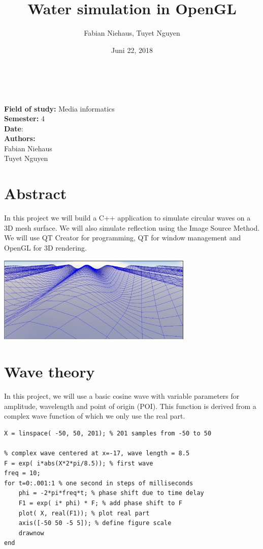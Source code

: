 \documentclass[12pt,a4paper]{scrartcl}
\title{Water simulation in OpenGL}
\author{Fabian Niehaus, Tuyet Nguyen}
\date{Juni 22, 2018}
\begin{document}
\begin{titlepage}
	\centering
	\ \\[2cm]
	{\huge\textbf{\@title}} 
	\\[3cm]
	\large
	\textbf{Field of study:} Media informatics \\
	\textbf{Semester:} 4
	\\[2cm]
	\textbf{Date}: \@date
	\\[2cm]
	\textbf {Authors:}
	\\Fabian Niehaus
	\\Tuyet Nguyen
\end{titlepage}

\newpage
\setcounter{page}{0}
\tableofcontents
\newpage
\listoffigures

\newpage
\ofoot[]{\pagemark}
\normalsize

\section{Abstract}
In this project we will build a C++ application to simulate circular waves on a 3D mesh surface. We will also simulate reflection using the Image Source Method. We will use QT Creator for programming, QT for window management and OpenGL for 3D rendering.

\includegraphics[width=0.7\textwidth]{Images/SinWaves.jpg}

\section{Wave theory}\label{wave-theory}
In this project, we will use a basic cosine wave with variable parameters for amplitude, wavelength and point of origin (POI). This function is derived from a complex wave function of which we only use the real part.
\begin{lstlisting}[language=PSEUDO]
X = linspace( -50, 50, 201); % 201 samples from -50 to 50

% complex wave centered at x=-17, wave length = 8.5
F = exp( i*abs(X*2*pi/8.5)); % first wave
freq = 10;
for t=0:.001:1 % one second in steps of milliseconds
	phi = -2*pi*freq*t; % phase shift due to time delay
	F1 = exp( i* phi) * F; % add phase shift to F
	plot( X, real(F1)); % plot real part
	axis([-50 50 -5 5]); % define figure scale
	drawnow
end
\end{lstlisting}
\end{document}

